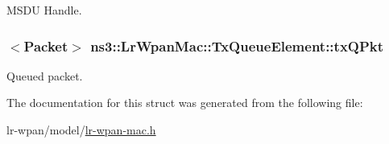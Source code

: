 M\+S\+DU Handle. 

\subsubsection[{\texorpdfstring{tx\+Q\+Pkt}{txQPkt}}]{$<${\bf Packet}$>$ ns3\+::\+Lr\+Wpan\+Mac\+::\+Tx\+Queue\+Element\+::tx\+Q\+Pkt}\hypertarget{structns3_1_1LrWpanMac_1_1TxQueueElement_a4af6aca9185414236f8cad149fb3fc06}{}\label{structns3_1_1LrWpanMac_1_1TxQueueElement_a4af6aca9185414236f8cad149fb3fc06}


Queued packet. 



The documentation for this struct was generated from the following file\+:\begin{DoxyCompactItemize}
\item 
lr-\/wpan/model/\hyperlink{lr-wpan-mac_8h}{lr-\/wpan-\/mac.\+h}\end{DoxyCompactItemize}
